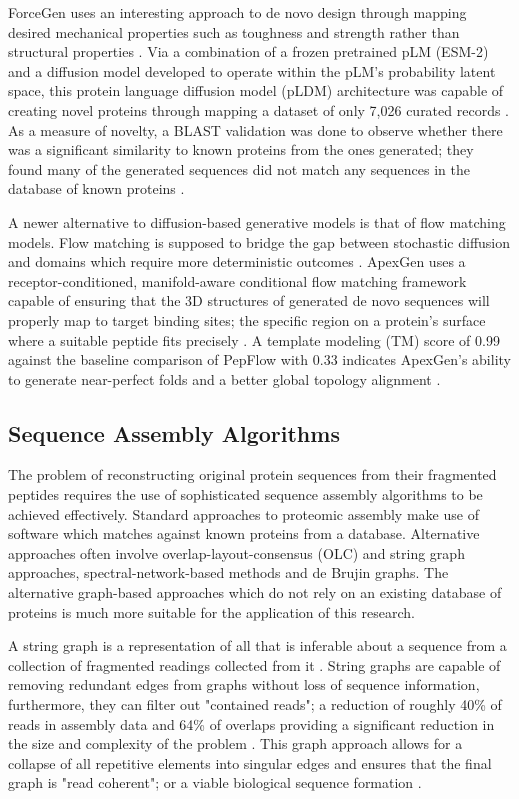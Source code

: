 \documentclass[journal]{IEEEtran}
\begin{document}
ForceGen uses an interesting approach to de novo design through mapping desired mechanical properties such as
toughness and strength rather than structural properties \cite{doi:10.1126/sciadv.adl4000}. Via a
combination of a frozen pretrained pLM (ESM-2) and a diffusion model developed to operate within the pLM's
probability latent space, this protein language diffusion model (pLDM) architecture was capable of creating
novel proteins through mapping a dataset of only 7,026 curated records \cite{doi:10.1126/sciadv.adl4000}.
As a measure of novelty, a BLAST validation was done to observe whether there was a significant similarity
to known proteins from the ones generated; they found many of the generated sequences did not match any
sequences in the database of known proteins \cite{doi:10.1126/sciadv.adl4000}.

A newer alternative to diffusion-based generative models is that of flow matching models. Flow matching
is supposed to bridge the gap between stochastic diffusion and domains which require more deterministic
outcomes \cite{xia2025apexgensimultaneousdesignpeptide}. ApexGen uses a receptor-conditioned,
manifold-aware conditional flow matching framework capable of ensuring that the 3D structures of
generated de novo sequences will properly map to target binding sites; the specific region on a protein's surface
where a suitable peptide fits precisely \cite{xia2025apexgensimultaneousdesignpeptide}.
A template modeling (TM) score of 0.99 against the baseline comparison of PepFlow with 0.33 indicates ApexGen's
ability to generate near-perfect folds and a better global topology alignment \cite{xia2025apexgensimultaneousdesignpeptide}.

\subsection{Sequence Assembly Algorithms}
The problem of reconstructing original protein sequences from their fragmented peptides requires the use of
sophisticated sequence assembly algorithms to be achieved effectively. Standard approaches to proteomic assembly
make use of software which matches against known proteins from a database. Alternative approaches
often involve overlap-layout-consensus (OLC) and string graph approaches, spectral-network-based methods
and de Brujin graphs. The alternative graph-based approaches which do not rely on an existing database of
proteins is much more suitable for the application of this research.

A string graph is a representation of all that is inferable about a sequence from a collection of fragmented
readings collected from it \cite{10.1093/bioinformatics/bti1114}. String graphs are capable of removing
redundant edges from graphs without loss of sequence information, furthermore, they can filter out "contained
reads"; a reduction of roughly 40\% of reads in assembly data and 64\% of overlaps providing a significant
reduction in the size and complexity of the problem \cite{10.1093/bioinformatics/bti1114}. This graph
approach allows for a collapse of all repetitive elements into singular edges and ensures that the final
graph is "read coherent"; or a viable biological sequence formation \cite{10.1093/bioinformatics/bti1114}.
\end{document}
